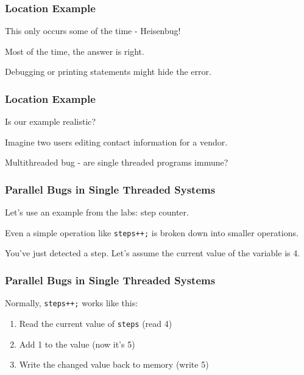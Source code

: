 \begin{frame}
\frametitle{Location Example}
\begin{changemargin}{1cm}
This only occurs some of the time - Heisenbug!

Most of the time, the answer is right.

Debugging or printing statements might hide the error.


\end{changemargin}
\end{frame}

\begin{frame}
\frametitle{Location Example}
\begin{changemargin}{1cm}
Is our example realistic?

Imagine two users editing contact information for a vendor.

Multithreaded bug - are single threaded programs immune?

\end{changemargin}
\end{frame}

\begin{frame}
\frametitle{Parallel Bugs in Single Threaded Systems}
\begin{changemargin}{1cm}
Let's use an example from the labs: step counter.

Even a simple operation like \texttt{steps++;} is broken down into smaller operations.

You've just detected a step. Let's assume the current value of the variable is 4.

\end{changemargin}
\end{frame}

\begin{frame}
\frametitle{Parallel Bugs in Single Threaded Systems}
\begin{changemargin}{1cm}
Normally, \texttt{steps++;} works like this:

\begin{enumerate}
	\item Read the current value of \texttt{steps} (read 4)
	\item Add 1 to the value (now it's 5)
	\item Write the changed value back to memory (write 5)
\end{enumerate}

\end{changemargin}
\end{frame}


